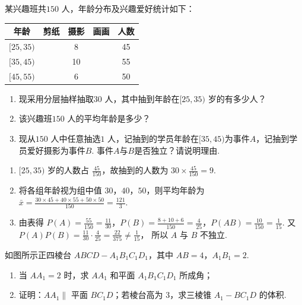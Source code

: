 \documentclass[UTF8,a4paper,oneside,11pt]{ctexbook}
\begin{document}
\begin{problem}
某兴趣班共\(150\text{ 人}\)，年龄分布及兴趣爱好统计如下：

\begin{center}
\renewcommand{\arraystretch}{1.25}
\begin{tabular}{|c|c|c|c|c|}
\hline
年龄 & 剪纸 & 摄影 & 画画 & 人数 \\
\hline
\([25,35)\) & & 8 & & 45 \\
\hline
\([35,45)\) & & 10 & & 55 \\
\hline
\([45,55)\) & & 6 & & 50 \\
\hline
\end{tabular}
\end{center}

\begin{enumerate}
\item 现采用分层抽样抽取\(30\text{ 人}\)，其中抽到年龄在\([25,35)\text{ 岁}\)的有多少人？
\item 该兴趣班\(150\text{ 人}\)的平均年龄是多少？
\item 现从\(150\text{ 人}\)中任意抽选\(1\text{ 人}\)，记抽到的学员年龄在\([35,45)\)为事件\(A\)，记抽到学员爱好摄影为事件\(B\). 事件\(A\)与\(B\)是否独立？请说明理由.
\end{enumerate}
\end{problem}

\begin{solution}
\begin{enumerate}
\item \([25,35)\) 岁的人数占 \(\frac{45}{150}\)，故抽到的人数为 \(30\times \frac{45}{150}=9\).

\item 将各组年龄视为组中值 \(30\)，\(40\)，\(50\)，则平均年龄为
\(\bar x=\frac{30\times45+40\times55+50\times50}{150}=\frac{121}{3}\).

\item 由表得
\(P(A)=\frac{55}{150}=\frac{11}{30}\)，\(P(B)=\frac{8+10+6}{150}=\frac{4}{25}\)，\(P(AB)=\frac{10}{150}=\frac{1}{15}\). 又 \(P(A)P(B)=\frac{11}{30}\cdot\frac{4}{25}=\frac{22}{375}\ne\frac{1}{15}\)，
所以 \(A\) 与 \(B\) 不独立.
\end{enumerate}
\end{solution}

\begin{problem}
如图所示正四棱台 \(ABCD-A_1B_1C_1D_1\)，其中 \(AB=4\)，\(A_1B_1=2\).
\begin{enumerate}
\item 当 \(AA_1=2\) 时，求 \(AA_1\) 和平面 \(A_1B_1C_1D_1\) 所成角；
\item 证明：\(AA_1\parallel\) 平面 \(BC_1D\)；若棱台高为 3，求三棱锥 \(A_1-BC_1D\) 的体积.
\end{enumerate}

\end{problem}
\end{document}
